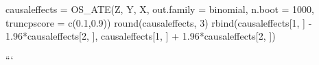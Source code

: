 \documentclass[
]{article}
\newenvironment{Shaded}{\begin{snugshade}}{\end{snugshade}}
\newcommand{\AttributeTok}[1]{\textcolor[rgb]{0.77,0.63,0.00}{#1}}
\newcommand{\DecValTok}[1]{\textcolor[rgb]{0.00,0.00,0.81}{#1}}
\newcommand{\FloatTok}[1]{\textcolor[rgb]{0.00,0.00,0.81}{#1}}
\newcommand{\FunctionTok}[1]{\textcolor[rgb]{0.00,0.00,0.00}{#1}}
\newcommand{\NormalTok}[1]{#1}
\newcommand{\OtherTok}[1]{\textcolor[rgb]{0.56,0.35,0.01}{#1}}
\newcommand{\SpecialCharTok}[1]{\textcolor[rgb]{0.00,0.00,0.00}{#1}}
\begin{document}
\begin{Shaded}
\begin{Highlighting}[]
\NormalTok{causaleffects }\OtherTok{=} \FunctionTok{OS\_ATE}\NormalTok{(Z, Y, X, }
                      \AttributeTok{out.family =}\NormalTok{ binomial, }\AttributeTok{n.boot =} \DecValTok{1000}\NormalTok{, }\AttributeTok{truncpscore =} \FunctionTok{c}\NormalTok{(}\FloatTok{0.1}\NormalTok{,}\FloatTok{0.9}\NormalTok{))}
\FunctionTok{round}\NormalTok{(causaleffects, }\DecValTok{3}\NormalTok{)}
\FunctionTok{rbind}\NormalTok{(causaleffects[}\DecValTok{1}\NormalTok{, ] }\SpecialCharTok{{-}} \FloatTok{1.96}\SpecialCharTok{*}\NormalTok{causaleffects[}\DecValTok{2}\NormalTok{, ],}
\NormalTok{      causaleffects[}\DecValTok{1}\NormalTok{, ] }\SpecialCharTok{+} \FloatTok{1.96}\SpecialCharTok{*}\NormalTok{causaleffects[}\DecValTok{2}\NormalTok{, ])}
\end{Highlighting}
\end{Shaded}

```
\end{document}
